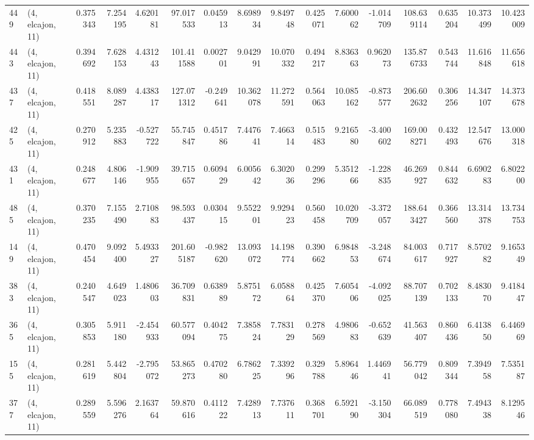 \begin{tabular}{llrrrrrrrrrrrrrr}
449 &  (4, elcajon, 11) &   0.375343 &   7.254195 &   4.620181 &    97.017533 &   0.045913 &   8.698934 &   9.849748 &  0.425071 &   7.600062 &  -1.014709 &   108.639114 &   0.635204 &  10.373499 &  10.423009 \\
443 &  (4, elcajon, 11) &   0.394692 &   7.628153 &   4.431243 &   101.411588 &   0.002701 &   9.042991 &  10.070332 &  0.494217 &   8.836363 &   0.962073 &   135.876733 &   0.543744 &  11.616848 &  11.656618 \\
437 &  (4, elcajon, 11) &   0.418551 &   8.089287 &   4.438317 &   127.071312 &  -0.249641 &  10.362078 &  11.272591 &  0.564063 &  10.085162 &  -0.873577 &   206.602632 &   0.306256 &  14.347107 &  14.373678 \\
425 &  (4, elcajon, 11) &   0.270912 &   5.235883 &  -0.527722 &    55.745847 &   0.451786 &   7.447641 &   7.466314 &  0.515483 &   9.216580 &  -3.400602 &   169.008271 &   0.432493 &  12.547676 &  13.000318 \\
431 &  (4, elcajon, 11) &   0.248677 &   4.806146 &  -1.909955 &    39.715657 &   0.609429 &   6.005642 &   6.302036 &  0.299296 &   5.351266 &  -1.228835 &    46.269927 &   0.844632 &   6.690283 &   6.802200 \\
485 &  (4, elcajon, 11) &   0.370235 &   7.155490 &   2.710883 &    98.593437 &   0.030415 &   9.552201 &   9.929423 &  0.560458 &  10.020709 &  -3.372057 &   188.643427 &   0.366560 &  13.314378 &  13.734753 \\
149 &  (4, elcajon, 11) &   0.470454 &   9.092400 &   5.493327 &   201.605187 &  -0.982620 &  13.093072 &  14.198774 &  0.390662 &   6.984853 &  -3.248674 &    84.003617 &   0.717927 &   8.570282 &   9.165349 \\
383 &  (4, elcajon, 11) &   0.240547 &   4.649023 &   1.480603 &    36.709831 &   0.638989 &   5.875172 &   6.058864 &  0.425370 &   7.605406 &  -4.092025 &    88.707139 &   0.702133 &   8.483070 &   9.418447 \\
365 &  (4, elcajon, 11) &   0.305853 &   5.911180 &  -2.454933 &    60.577094 &   0.404275 &   7.385824 &   7.783129 &  0.278569 &   4.980683 &  -0.652639 &    41.563407 &   0.860436 &   6.413850 &   6.446969 \\
155 &  (4, elcajon, 11) &   0.281619 &   5.442804 &  -2.795072 &    53.865273 &   0.470280 &   6.786225 &   7.339296 &  0.329788 &   5.896446 &   1.446941 &    56.779042 &   0.809344 &   7.394958 &   7.535187 \\
377 &  (4, elcajon, 11) &   0.289559 &   5.596276 &   2.163764 &    59.870616 &   0.411222 &   7.428913 &   7.737611 &  0.368701 &   6.592190 &  -3.150304 &    66.089519 &   0.778080 &   7.494338 &   8.129546 \\

\end{tabular}
